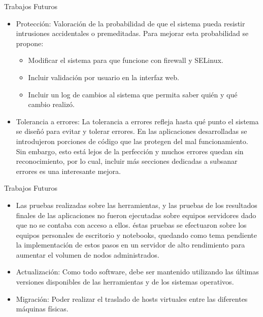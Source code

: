 \begin{frame}{Trabajos Futuros}
    \vspace{-1.5cm}
    \begin{itemize}
        \item Protección: Valoración de la probabilidad de que el sistema pueda resistir intrusiones accidentales o premeditadas. Para mejorar esta probabilidad se propone:
        \begin{itemize}
            \item  Modificar el sistema para que funcione con firewall y SELinux.

            \item  Incluir validación por usuario en la interfaz web. 

            \item  Incluir un log de cambios al sistema que permita saber quién y qué cambio realizó.
        \end{itemize}
        \item Tolerancia a errores: La tolerancia a errores refleja hasta qué punto el sistema se diseñó para evitar y tolerar errores. En las aplicaciones desarrolladas se introdujeron porciones de código que las protegen del mal funcionamiento. Sin embargo, esto está lejos de la perfección y muchos errores quedan sin reconocimiento, por lo cual, incluir más secciones dedicadas a subsanar errores es una interesante mejora.
    \end{itemize}

\end{frame}


\begin{frame}{Trabajos Futuros}
    \vspace{-1.5cm}
    \begin{itemize}
        \item Las pruebas realizadas sobre las herramientas, y las pruebas de los resultados finales de las aplicaciones no fueron ejecutadas sobre equipos servidores dado que no se contaba con acceso a ellos. éstas pruebas se efectuaron sobre los equipos personales de escritorio y notebooks, quedando como tema pendiente la implementación de estos pasos en un servidor de alto rendimiento para aumentar el volumen de nodos administrados. 

        \item Actualización: Como todo software, debe ser mantenido utilizando las últimas versiones disponibles de las herramientas y de los sistemas operativos.

        \item Migración: Poder realizar el traslado de hosts virtuales entre las diferentes máquinas físicas.
    \end{itemize}

\end{frame}


